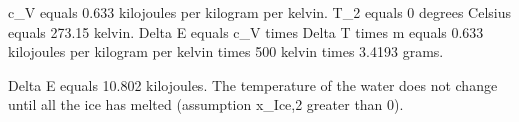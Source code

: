 c_V equals 0.633 kilojoules per kilogram per kelvin.  
T_2 equals 0 degrees Celsius equals 273.15 kelvin.  
Delta E equals c_V times Delta T times m equals 0.633 kilojoules per kilogram per kelvin times 500 kelvin times 3.4193 grams.  

Delta E equals 10.802 kilojoules.  
The temperature of the water does not change until all the ice has melted (assumption x_Ice,2 greater than 0).